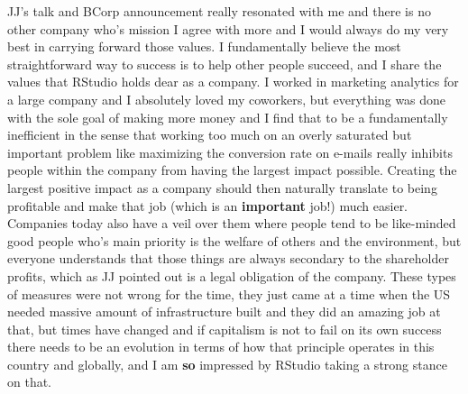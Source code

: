 \documentclass[
]{book}
\begin{document}
JJ's talk and BCorp announcement really resonated with me and there is no other company who's mission I agree with more and I would always do my very best in carrying forward those values. I fundamentally believe the most straightforward way to success is to help other people succeed, and I share the values that RStudio holds dear as a company. I worked in marketing analytics for a large company and I absolutely loved my coworkers, but everything was done with the sole goal of making more money and I find that to be a fundamentally inefficient in the sense that working too much on an overly saturated but important problem like maximizing the conversion rate on e-mails really inhibits people within the company from having the largest impact possible. Creating the largest positive impact as a company should then naturally translate to being profitable and make that job (which is an \textbf{important} job!) much easier. Companies today also have a veil over them where people tend to be like-minded good people who's main priority is the welfare of others and the environment, but everyone understands that those things are always secondary to the shareholder profits, which as JJ pointed out is a legal obligation of the company. These types of measures were not wrong for the time, they just came at a time when the US needed massive amount of infrastructure built and they did an amazing job at that, but times have changed and if capitalism is not to fail on its own success there needs to be an evolution in terms of how that principle operates in this country and globally, and I am \textbf{so} impressed by RStudio taking a strong stance on that.
\end{document}
